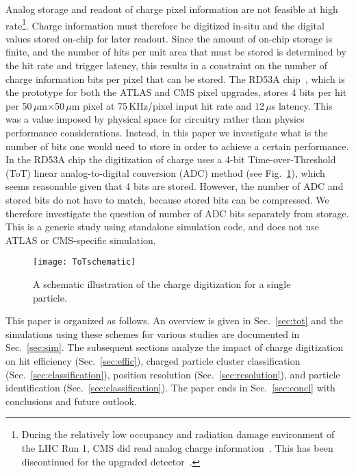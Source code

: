 \documentclass[12pt]{article}
\begin{document}
Analog storage and readout of charge pixel information are not feasible at high rate\footnote{During the relatively low occupancy and radiation damage environment of the LHC Run 1, CMS did read analog charge information~\cite{Karimaki:368412}.  This has been discontinued for the upgraded detector~\cite{Dominguez:1481838}.}.  
Charge information must therefore be digitized in-situ and the digital values stored on-chip for later readout.
Since the amount of on-chip storage is finite, and the number of hits per unit area that must be 
stored is determined by the hit rate and trigger latency, this results in a constraint on the number 
of charge information bits per pixel that can be stored. The RD53A chip~\cite{Garcia-Sciveres:2113263}, 
which is the prototype for both the ATLAS and CMS pixel upgrades, 
stores 4 bits per hit per 50\,$\mu$m$\times$50\,$\mu$m pixel at 75\,KHz/pixel input hit rate
and 12\,$\mu$s latency. This was a value imposed by physical space for circuitry rather than physics performance 
considerations. Instead, in this paper we investigate what is the number of bits one would need to store
in order to achieve a certain performance. In the RD53A chip the digitization of charge uses a 4-bit
Time-over-Threshold (ToT) linear analog-to-digital conversion (ADC) method (see Fig.~\ref{fig:ToTschematic}), which seems reasonable given that 4 bits are stored. However,
the number of ADC and stored bits do not have to match, because stored bits can be compressed. We therefore 
investigate the question of number of ADC bits separately from storage.  This is a generic study using standalone simulation code, and does not use ATLAS or CMS-specific simulation.

\begin{figure}[h!]
\centering
\texttt{[image: ToTschematic]}
\caption{A schematic illustration of the charge digitization for a single particle.}
\label{fig:ToTschematic}
\end{figure}


This paper is organized as follows.  An overview is given in Sec.~\ref{sec:tot} and the simulations using these schemes for various studies are documented in Sec.~\ref{sec:sim}.  The subsequent sections analyze the impact of charge digitization on hit efficiency (Sec.~\ref{sec:effic}), charged particle cluster classification (Sec.~\ref{sec:classification}), position resolution (Sec.~\ref{sec:resolution}), and particle identification (Sec.~\ref{sec:classification}).  The paper ends in Sec.~\ref{sec:concl} with conclusions and future outlook.
\end{document}
